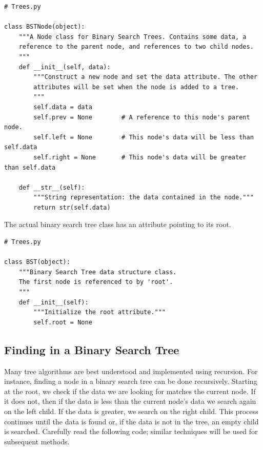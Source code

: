 \begin{lstlisting}
# Trees.py

class BSTNode(object):
    """A Node class for Binary Search Trees. Contains some data, a
    reference to the parent node, and references to two child nodes.
    """
    def __init__(self, data):
        """Construct a new node and set the data attribute. The other
        attributes will be set when the node is added to a tree.
        """
        self.data = data
        self.prev = None        # A reference to this node's parent node.
        self.left = None        # This node's data will be less than self.data
        self.right = None       # This node's data will be greater than self.data
        
    def __str__(self):
        """String representation: the data contained in the node."""
        return str(self.data)
\end{lstlisting}

The actual binary search tree class has an attribute pointing to its root.

\begin{lstlisting}
# Trees.py

class BST(object):
    """Binary Search Tree data structure class.
    The first node is referenced to by 'root'.
    """
    def __init__(self):
        """Initialize the root attribute."""
        self.root = None
\end{lstlisting}

\subsection*{Finding in a Binary Search Tree}

Many tree algorithms are best understood and implemented using recursion.
For instance, finding a node in a binary search tree can be done recursively.
Starting at the root, we check if the data we are looking for matches the current node.
If it does not, then if the data is less than the current node's data we search again on the left child.
If the data is greater, we search on the right child.
This process continues until the data is found or, if the data is not in the tree, an empty child is searched.
Carefully read the following code; similar techniques will be used for subsequent methods.

